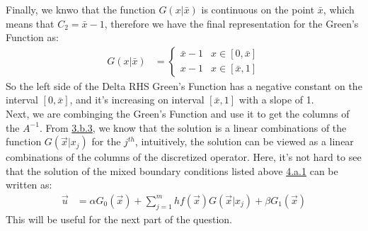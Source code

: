 \documentclass[]{article}
\begin{document}
        Finally, we knwo that the function $G(x|\bar{x})$ is continuous on the point $\bar{x}$, which means that $C_2 = \bar{x} - 1$, therefore we have the final representation for the Green's Function as: 
        \begin{align*}\tag{4.a.5}\label{eqn:4.a.5}
            G(x|\bar{x}) &= \begin{cases}
                \bar{x} - 1 & x \in [0, \bar{x}] 
                \\
                x - 1 & x \in [\bar{x}, 1]
            \end{cases}
        \end{align*}
        So the left side of the Delta RHS Green's Function has a negative constant on the interval $[0, \bar{x}]$, and it's increasing on interval $[\bar{x}, 1]$ with a slope of 1. 
        \\
        Next, we are combinging the Green's Function and use it to get the columns of the $A^{-1}$. From \hyperref[eqn:3.b.3]{3.b.3}, we know that the solution is a linear combinations of the function $G(\vec{x}|x_j)$ for the $j^{th}$, intuitively, the solution can be viewed as a linear combinations of the columns of the discretized operator. Here, it's not hard to see that the solution of the mixed boundary conditions listed above \hyperref[eqn:4.a.1]{4.a.1} can be written as: 
        \begin{align*}\tag{5.a.6}\label{eqn:5.a.6}
            \vec{u} &= \alpha G_0(\vec{x}) + \sum_{j= 1}^{m}
            hf(\vec{x})G(\vec{x}| x_j) + \beta G_1(\vec{x})
        \end{align*}
        This will be useful for the next part of the question. 
\end{document}
